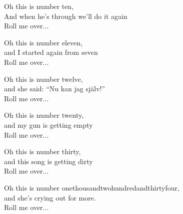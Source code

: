 \vspace{7pt}
Oh this is number ten,\\
And when he's through we'll do it again\\
Roll me over...\par
\vspace{7pt}
Oh this is number eleven,\\
and I started again from seven\\
Roll me over...\par
\vspace{7pt}
Oh this is number twelve,\\
and she said: ``Nu kan jag själv!''\\
Roll me over...\par
\vspace{7pt}
Oh this is number twenty,\\
and my gun is getting empty\\
Roll me over...\par
\vspace{7pt}
Oh this is number thirty,\\
and this song is getting dirty\\
Roll me over...\par
\vspace{7pt}
Oh this is number onethousandtwohundredandthirtyfour,\\
and she's crying out for more.\\
Roll me over...
\vspace*{-10pt}

